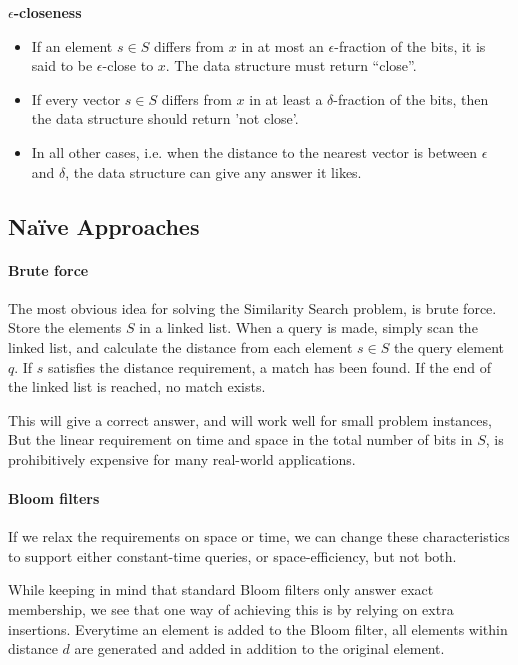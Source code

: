 \documentclass[a4paper,11pt]{article}
\begin{document}
\begin{description}
\item \textbf{$\epsilon$-closeness}
  \begin{itemize}
    \item If an element $s \in S$ differs from $x$ in at most an $\epsilon$-fraction of the bits, it is said to be $\epsilon$-close to $x$. The data structure must return “close”.
    \item If every vector $s \in S$ differs from $x$ in at least a $\delta$-fraction of the bits, then the data structure should return 'not close'.
    \item In all other cases, i.e. when the distance to the nearest vector is between $\epsilon$ and $\delta$, the data structure can give any answer it likes.
  \end{itemize}

\end{description}

\subsection{Naïve Approaches}
\label{naive_approaches}

\paragraph{Brute force}
The most obvious idea for solving the Similarity Search problem, is brute force. Store the elements $S$ in a linked list. When a query is made, simply scan the linked list, and calculate the distance from each element $s \in S$ the query element $q$. If $s$ satisfies the distance requirement, a match has been found. If the end of the linked list is reached, no match exists.

This will give a correct answer, and will work well for small problem instances, But the linear requirement on time and space in the total number of bits in $S$, is prohibitively expensive for many real-world applications.

\paragraph{Bloom filters} If we relax the requirements on space or time, we can change these characteristics to support either constant-time queries, or space-efficiency, but not both.

While keeping in mind that standard Bloom filters only answer exact membership, we see that one way of achieving this is by relying on extra insertions. Everytime an element is added to the Bloom filter, all elements within distance $d$ are generated and added in addition to the original element.
\end{document}
